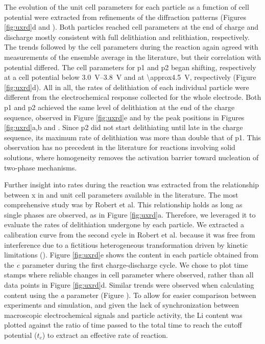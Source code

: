 \documentclass{article}
\begin{document}
The evolution of the unit cell parameters for each particle as a
function of cell potential were extracted from refinements of the
diffraction patterns (Figures \ref{fig:uxrd}d and
). Both particles reached cell parameters at
the end of charge and discharge mostly consistent with full
delithiation and relithiation, respectively.\cite{novak2015} The
trends followed by the cell parameters during the reaction again
agreed with measurements of the ensemble average in the
literature\cite{novak2015}, but their correlation with potential
differed. The cell parameters for \gls{p1} and \gls{p2} began
shifting, respectively at a cell potential below
\SIrange{3.0}{3.8}{\volt} and at \SI{\approx4.5}{\volt}, respectively
(Figure \ref{fig:uxrd}d). All in all, the rates of delithiation of
each individual particle were different from the electrochemical
response collected for the whole electrode. Both \gls{p1} and \gls{p2}
achieved the same level of delithiation at the end of the charge
sequence, observed in Figure \ref{fig:uxrd}e and by the peak positions
in Figures \ref{fig:uxrd}a,b and . Since \gls{p2}
did not start delithiating until late in the charge sequence, its
maximum rate of delithiation was more than double that of
\gls{p1}. This observation has no precedent in the literature for
reactions involving solid solutions, where homogeneity removes the
activation barrier toward nucleation of two-phase mechanisms.


Further insight into rates during the reaction was extracted from the
relationship between x in  and unit cell parameters available
in the literature. The most comprehensive study was by Robert et
al.\cite{robert2015} This relationship holds as long as single phases
are observed, as in Figure \ref{fig:uxrd}a. Therefore, we leveraged it
to evaluate the rates of delithiation undergone by each particle. We
extracted a calibration curve from the second cycle in Robert et
al.\cite{robert2015} because it was free from interference due to a
fictitious heterogeneous transformation driven by kinetic limitations
(). Figure \ref{fig:uxrd}e shows the 
content in each  particle obtained from the \emph{c} parameter
during the first charge-discharge cycle. We chose to plot time stamps
where reliable changes in cell parameter where observed, rather than
all data points in Figure \ref{fig:uxrd}d. Similar trends were
observed when calculating  content using the \emph{a} parameter
(Figure ). To allow for easier comparison between
experiments and simulation, and given the lack of synchronization
between macroscopic electrochemical signals and particle activity, the
Li content was plotted against the ratio of time passed to the total
time to reach the cutoff potential ($t_c$) to extract an effective
rate of reaction.
\end{document}
